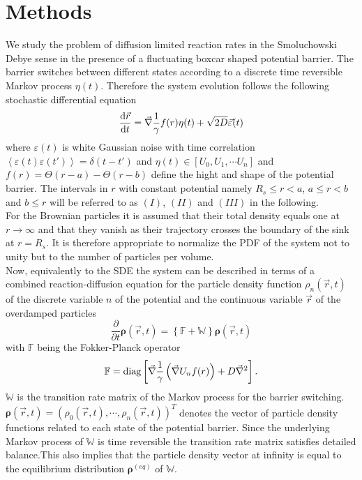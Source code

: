 \documentclass[twocolumn,superscriptaddress]{revtex4}
\newcommand{\vect}[1]{\boldsymbol{\mathbf{#1}}}
\begin{document}
\section{Methods} We study the problem of diffusion limited reaction rates in the Smoluchowski Debye sense \cite{Smoluchowski1917a, Debye1942} in the presence of a fluctuating boxcar shaped potential barrier. The barrier switches between different states according to a discrete time reversible Markov process $\eta(t)$. Therefore the system evolution follows the following stochastic differential equation
\begin{equation}
    \frac{{\rm d} \vec{r}}{{\rm d} t} = \vec{\nabla}\frac{1}{\gamma}f(r)\eta(t) + \sqrt{2D}\vec{\varepsilon}(t)
    \label{SDE}
\end{equation}
where $\varepsilon(t)$ is white Gaussian noise with time correlation $\left< \varepsilon(t) \varepsilon(t') \right> = \delta(t-t')$ and $\eta(t) \in [U_0, U_1,\cdots U_n]$ and $f(r) = \Theta(r-a)-\Theta(r-b)$ define the hight and shape of the potential barrier. The intervals in $r$ with constant potential namely $R_s \le r < a$, $a \le r < b$ and $b\le r$ will be referred to as $(I)$, $(II)$ and $(III)$ in the following.\\
For the Brownian particles it is assumed that their total density equals one at $r \rightarrow \infty$ and that they vanish as their trajectory crosses the boundary of the sink at $r = R_s$. It is therefore appropriate to normalize the PDF of the system not to unity but to the number of particles per volume. \\
Now, equivalently to the SDE the system can be described in terms of a combined reaction-diffusion equation for the particle density function $\rho_n(\vec{r},t)$ of the discrete variable $n$ of the potential and the continuous variable $\vec{r}$ of the overdamped particles
\begin{equation}
    \frac{\partial}{\partial t}\vect{\rho}(\vec{r},t) = \left\{ \mathbb{F} + \mathbb{W} \right\} \vect{\rho}(\vec{r},t)
    \label{mfpe}
\end{equation}
with $\mathbb{F}$ being the Fokker-Planck operator
\begin{equation}
    \mathbb{F} = {\rm  diag}\left[\vec{\nabla} \frac{1}{\gamma} \left(\vec{\nabla} U_n f(r)\right) + D\vec{\nabla}^{2} \right].
    \label{FPO}
\end{equation}
$\mathbb{W}$ is the transition rate matrix of the Markov process for the barrier switching. $\vect{\rho}(\vec{r},t)=(\rho_0(\vec{r},t),\cdots,\rho_n(\vec{r},t))^{T}$ denotes the vector of particle density functions related to each state of the potential barrier. Since the underlying Markov process of $\mathbb{W}$ is time reversible the transition rate matrix satisfies detailed balance.This also implies that the particle density vector at infinity is equal to the equilibrium distribution $\vect{\rho}^{(eq)}$ of $\mathbb{W}$. \\
\end{document}
